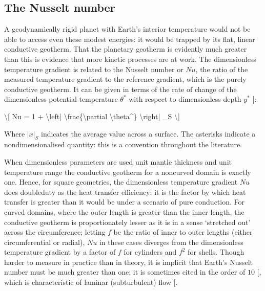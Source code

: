 \documentclass[letterpaper,10pt,english]{jupyterBook}
\begin{document}
\subsection{The Nusselt number}
\label{\detokenize{content/chapter_02_methods/section1:the-nusselt-number}}
\sphinxAtStartPar
A geodynamically rigid planet with Earth’s interior temperature would not be able to access even these modest energies: it would be trapped by its flat, linear conductive geotherm. That the planetary geotherm is evidently much greater than this is evidence that more kinetic processes are at work. The dimensionless temperature gradient is related to the Nusselt number or \(Nu\), the ratio of the measured temperature gradient to the reference gradient, which is the purely conductive geotherm. It can be given in terms of the rate of change of the dimensionless potential temperature \(\theta^*\) with respect to dimensionless depth \(y^*\) {[}\sphinxcite{references:id89}{]}:

\sphinxAtStartPar
\textbackslash{}{[} Nu = 1 + \textbackslash{}left| \textbackslash{}frac\{\textbackslash{}partial \textbackslash{}theta\textasciicircum{}\} \textbackslash{}right| \_S \textbackslash{}{]}

\sphinxAtStartPar
Where \(|x|_S\) indicates the average value across a surface. The asterisks indicate a non\sphinxhyphen{}dimensionalised quantity: this is a convention throughout the literature.

\sphinxAtStartPar
When dimensionless parameters are used \sphinxhyphen{} unit mantle thickness and unit temperature range \sphinxhyphen{} the conductive geotherm for a non\sphinxhyphen{}curved domain is exactly one. Hence, for square geometries, the dimensionless temperature gradient \(Nu\) does double\sphinxhyphen{}duty as the heat transfer efficiency: it is the factor by which heat transfer is greater than it would be under a scenario of pure conduction. For curved domains, where the outer length is greater than the inner length, the conductive geotherm is proportionately lesser as it is in a sense ‘stretched out’ across the circumference; letting \(f\) be the ratio of inner to outer lengths (either circumferential or radial), \(Nu\) in these cases diverges from the dimensionless temperature gradient by a factor of \(f\) for cylinders and \(f^2\) for shells. Though harder to measure in practice than in theory, it is implicit that Earth’s Nusselt number must be much greater than one; it is sometimes cited in the order of \(10\) {[}\sphinxcite{references:id84}{]}, which is characteristic of laminar (sub\sphinxhyphen{}turbulent) flow {[}\sphinxcite{references:id83}{]}.
\end{document}
